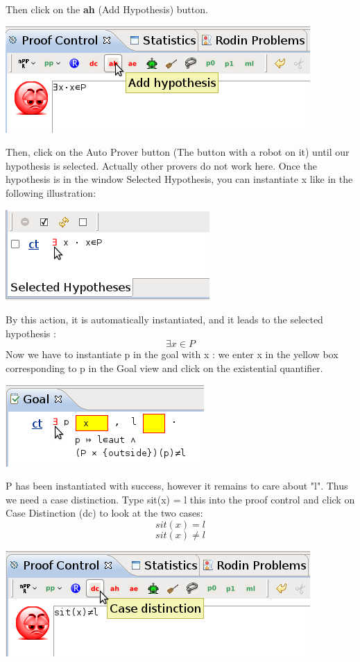 Then click on the \textbf{ah} (Add Hypothesis) button.
\begin{center}
	\includegraphics[]{img/tutorial/tut_10_hypothesis.png}
\end{center}


Then, click on the Auto Prover button (The button with a robot on it) until our hypothesis is selected. Actually other provers do not work here.
Once the hypothesis is in the window \textsf{Selected Hypothesis}, you can instantiate x like in the following illustration:

\begin{center}
	\includegraphics[]{img/tutorial/tut_10_instantiate_x.png}
\end{center}

By this action, it is automatically instantiated, and it leads to the selected hypothesis :
\[
\exists x \in P 
\]
Now we have to instantiate p in the goal with x : we enter x in the yellow box corresponding to p in the Goal view and click on the existential quantifier.

\begin{center}
	\includegraphics[]{img/tutorial/tut_10_instantiate_p.png}
\end{center}

P has been instantiated with success, however it remains to care about "l". Thus we need a case distinction.
Type sit(x) = l this into the proof control and click on Case Distinction (dc) to look at the two cases:
\[
sit(x)=l 
\]
\[
sit(x) \neq l
\]
\begin{center}
	\includegraphics[]{img/tutorial/tut_10_case_distinction.png}
\end{center}

